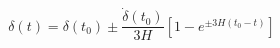 \begin{equation}\label{exp}
\delta(t)=\delta(t_0)\pm\frac{\dot{\delta}(t_0)}{3H}[1-e^{\pm3H(t_0-t)}]
\end{equation}

